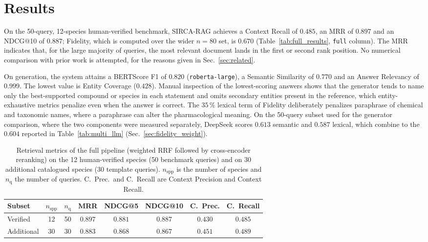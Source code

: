 \documentclass[runningheads]{llncs}
\newcommand{\sirca}{\textsc{SIRCA-RAG}}
\begin{document}
\section{Results}
\label{sec:results}

On the 50-query, 12-species human-verified benchmark, \sirca{} achieves a Context Recall of $0.485$, an MRR of $0.897$ and an NDCG@10 of $0.887$; Fidelity, which is computed over the wider $n{=}80$ set, is $0.670$ (Table~\ref{tab:full_results}, \texttt{full} column). The MRR indicates that, for the large majority of queries, the most relevant document lands in the first or second rank position. No numerical comparison with prior work is attempted, for the reasons given in Sec.~\ref{sec:related}.

On generation, the system attains a BERTScore F1 of $0.820$ (\texttt{roberta-large}), a Semantic Similarity of $0.770$ and an Answer Relevancy of $0.999$. The lowest value is Entity Coverage ($0.428$). Manual inspection of the lowest-scoring answers shows that the generator tends to name only the best-supported compound or species in each statement and omits secondary entities present in the reference, which entity-exhaustive metrics penalize even when the answer is correct. The $35\,\%$ lexical term of Fidelity deliberately penalizes paraphrase of chemical and taxonomic names, where a paraphrase can alter the pharmacological meaning. On the 50-query subset used for the generator comparison, where the two components were measured separately, DeepSeek scores $0.613$ semantic and $0.587$ lexical, which combine to the $0.604$ reported in Table~\ref{tab:multi_llm} (Sec.~\ref{sec:fidelity_weight}).

\begin{table}[!ht]
\centering
\caption{Retrieval metrics of the full pipeline (weighted RRF followed by cross-encoder reranking) on the 12 human-verified species (50 benchmark queries) and on 30 additional catalogued species (30 template queries). $n_{\text{spp}}$ is the number of species and $n_{\text{q}}$ the number of queries. C.\ Prec.\ and C.\ Recall are Context Precision and Context Recall.}
\label{tab:extended_retrieval}
\footnotesize
\setlength{\tabcolsep}{2.5pt}
\begin{tabular}{l c c c c c c c}
\toprule
\textbf{Subset} & $n_{\text{spp}}$ & $n_{\text{q}}$ & \textbf{MRR} & \textbf{NDCG@5} & \textbf{NDCG@10} & \textbf{C.\ Prec.} & \textbf{C.\ Recall} \\
\midrule
Verified & 12 & 50 & $0.897$ & $0.881$ & $0.887$ & $0.430$ & $0.485$ \\
Additional & 30 & 30 & $0.883$ & $0.868$ & $0.867$ & $0.451$ & $0.489$ \\
\bottomrule
\end{tabular}
\end{table}
\end{document}
